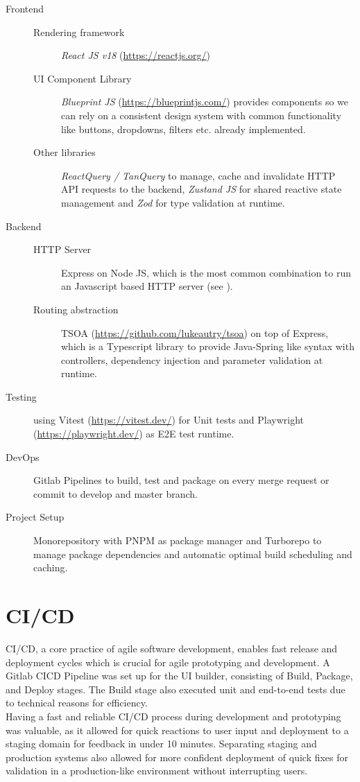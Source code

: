 \begin{description}
  \item[Frontend] \leavevmode
  \begin{description}
    \item[Rendering framework] \textit{React JS v18} (\url{https://reactjs.org/})
    \item[UI Component Library] \textit{Blueprint JS} (\url{https://blueprintjs.com/}) provides components so we can rely on a consistent design system with common functionality like buttons, dropdowns, filters etc. already implemented.
    \item[Other libraries] \textit{ReactQuery / TanQuery} to manage, cache and invalidate HTTP API requests to the backend, \textit{Zustand JS} for shared reactive state management and \textit{Zod} for type validation at runtime.
  \end{description}
  \item[Backend] \leavevmode
  \begin{description}
    \item[HTTP Server] Express on Node JS, which is the most common combination to run an Javascript based HTTP server (see \cite{Github:VanoDevium/node-framework-stars}).
    \item[Routing abstraction] TSOA (\url{https://github.com/lukeautry/tsoa}) on top of Express, which is a Typescript library to provide Java-Spring like syntax with controllers, dependency injection and parameter validation at runtime.
  \end{description}
  \item[Testing] using Vitest (\url{https://vitest.dev/}) for Unit tests and Playwright (\url{https://playwright.dev/}) as E2E test runtime. 
  \item[DevOps] Gitlab Pipelines to build, test and package on every merge request or commit to develop and master branch.
  \item[Project Setup] Monorepository with PNPM as package manager and Turborepo to manage package dependencies and automatic optimal build scheduling and caching.
\end{description}

\section{CI/CD}

CI/CD, a core practice of agile software development, enables fast release and deployment cycles which is crucial for agile prototyping and development.
A Gitlab CICD Pipeline was set up for the UI builder, consisting of Build, Package, and Deploy stages.
The Build stage also executed unit and end-to-end tests due to technical reasons for efficiency.\\
Having a fast and reliable CI/CD process during development and prototyping was valuable, as it allowed for quick reactions to user input and deployment to a staging domain for feedback in under 10 minutes.
Separating staging and production systems also allowed for more confident deployment of quick fixes for validation in a production-like environment without interrupting users.

